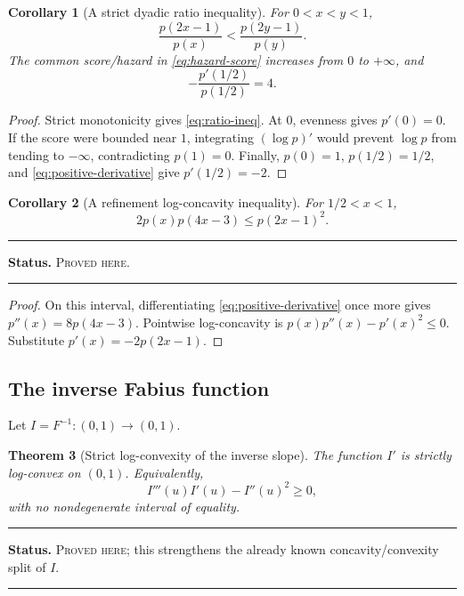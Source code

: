 \documentclass[11pt,oneside]{article}
\newtheorem{theorem}{Theorem}[section]
\newtheorem{corollary}[theorem]{Corollary}
\theoremstyle{definition}
\theoremstyle{remark}
\newenvironment{boxedremark}{%
  \par\smallskip\noindent\begin{center}\begin{minipage}{0.94\textwidth}%
  \color{black}\hrule\vspace{0.6em}\small
}{%
  \vspace{0.6em}\hrule\end{minipage}\end{center}\smallskip
}
\newcommand{\ProvedHere}{\textsc{Proved here}}
\newcommand{\Status}[1]{%
  \begin{boxedremark}\textbf{Status.} #1.\end{boxedremark}}
\begin{document}
\begin{corollary}[A strict dyadic ratio inequality]\label{cor:ratio}
For $0<x<y<1$,
\begin{equation}\label{eq:ratio-ineq}
 \frac{p(2x-1)}{p(x)}<\frac{p(2y-1)}{p(y)}.
\end{equation}
The common score/hazard in \eqref{eq:hazard-score} increases from $0$ to
$+\infty$, and
\begin{equation}\label{eq:score-half}
 -\frac{p'(1/2)}{p(1/2)}=4.
\end{equation}
\end{corollary}

\begin{proof}
Strict monotonicity gives \eqref{eq:ratio-ineq}.  At $0$, evenness gives $p'(0)=0$.
If the score were bounded near $1$, integrating $(\log p)'$ would prevent
$\log p$ from tending to $-\infty$, contradicting $p(1)=0$.  Finally,
$p(0)=1$, $p(1/2)=1/2$, and \eqref{eq:positive-derivative} give
$p'(1/2)=-2$.
\end{proof}

\begin{corollary}[A refinement log-concavity inequality]\label{cor:refinement-ineq}
For $1/2<x<1$,
\begin{equation}\label{eq:three-scale-ineq}
 2p(x)p(4x-3)\le p(2x-1)^2.
\end{equation}
\end{corollary}
\Status{\ProvedHere}

\begin{proof}
On this interval, differentiating \eqref{eq:positive-derivative} once more gives
$p''(x)=8p(4x-3)$.  Pointwise log-concavity is
$p(x)p''(x)-p'(x)^2\le0$.  Substitute $p'(x)=-2p(2x-1)$.
\end{proof}

\subsection{The inverse Fabius function}
Let $I=F^{-1}:(0,1)\to(0,1)$.

\begin{theorem}[Strict log-convexity of the inverse slope]\label{thm:inverse-logconvex}
The function $I'$ is strictly log-convex on $(0,1)$.  Equivalently,
\begin{equation}\label{eq:inverse-third}
 I'''(u)I'(u)-I''(u)^2\ge0,
\end{equation}
with no nondegenerate interval of equality.
\end{theorem}
\Status{\ProvedHere; this strengthens the already known concavity/convexity split
of $I$}
\end{document}
